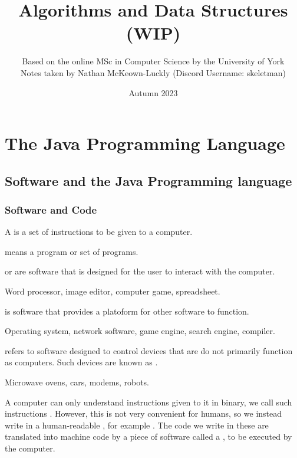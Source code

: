 \documentclass[11pt]{report}
\title{Algorithms and Data Structures (WIP)}
\date{Autumn 2023}
\author{Based on the online MSc in Computer Science by the University of York\\ Notes taken by Nathan McKeown-Luckly (Discord Username: skeletman)}
\begin{document}
\maketitle
\tableofcontents
\pagebreak
\chapter{The Java Programming Language}
\section{Software and the Java Programming language}
\subsection{Software and Code}
\begin{defi}
    A  is a set of instructions to be given to a computer.
\end{defi}
\begin{defi}[Software]
     means a program or set of programs.
\end{defi}
\begin{defi}
     or  are software that is designed for the user to interact with the computer.
\end{defi}
\begin{egs}
    Word processor, image editor, computer game, spreadsheet.
\end{egs}
\begin{defi}
     is software that provides a platoform for other software to function.
\end{defi}
\begin{egs}
    Operating system, network software, game engine, search engine, compiler.
\end{egs}
\begin{defi}
     refers to software designed to control devices that are do not primarily function as computers. Such devices are known as .
\end{defi}
\begin{egs}
    Microwave ovens, cars, modems, robots.
\end{egs}
A computer can only understand instructions given to it in binary, we call such instructions . However, this is not very convenient for humans, so we instead write in a human-readable , for example . The code we write in these are translated into machine code by a piece of software called a , to be executed by the computer.
\end{document}
